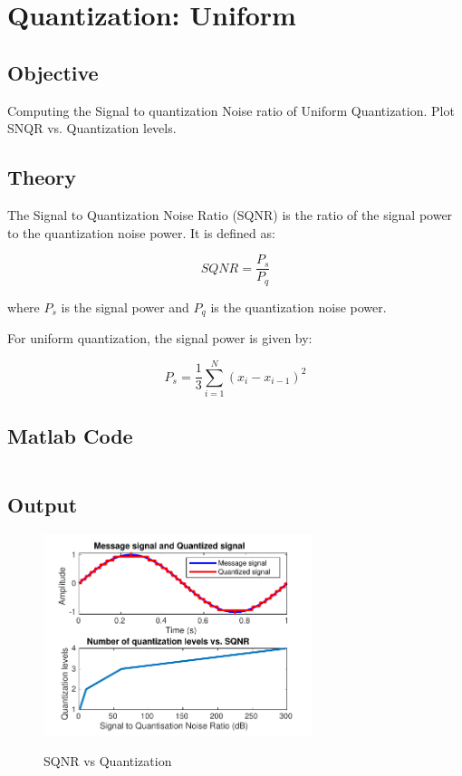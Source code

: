 \section{Quantization: Uniform}
\label{sec:Quantization: Uniform}

\subsection{Objective}
Computing the Signal to quantization Noise ratio of Uniform Quantization. 
Plot SNQR vs. Quantization levels.

\subsection{Theory}
The Signal to Quantization Noise Ratio (SQNR) is the ratio of the signal power to the quantization noise power.
It is defined as:

\begin{equation}
	SQNR = \frac{P_s}{P_q}
\end{equation}

where $P_s$ is the signal power and $P_q$ is the quantization noise power.

For uniform quantization, the signal power is given by:

\begin{equation}
	P_s = \frac{1}{3} \sum_{i=1}^{N} (x_i - x_{i-1})^2
\end{equation}

\subsection{Matlab Code}

\inputminted[fontsize=\footnotesize,autogobble]{matlab}{code/sqnr.m}

\subsection{Output}

\begin{figure}[!htb]
	\centering
	\includegraphics[width=0.70\textwidth]{res/figures/Figure_6.pdf}
	\label{output:SQNR vs quantization}
	\caption{SQNR vs Quantization}
\end{figure}

